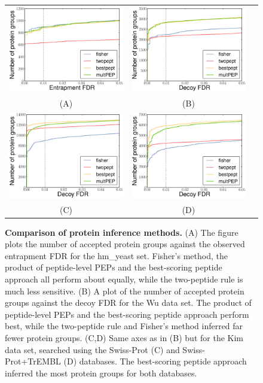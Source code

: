 \documentclass{article}
\begin{document}
\begin{figure}
\centering
\begin{tabular}{ccc}
\includegraphics[width=0.45\linewidth]
{./img/unique-pept-performance} &
\includegraphics[width=0.45\linewidth]
{./img/wu-ipi-performance}\\
(A) & (B)\\
\includegraphics[width=0.45\linewidth]
{./img/kim-swissprot-performance} &
\includegraphics[width=0.45\linewidth]
{./img/kim-uniprot-performance}\\
(C) & (D)
\end{tabular}
  \caption{{\bf Comparison of protein inference methods.} (A) The
figure plots the number of accepted protein groups against the
observed entrapment FDR for the hm\_yeast set. Fisher's method, the
product of peptide-level PEPs and the best-scoring peptide approach
all perform about equally, while the two-peptide rule is much less
sensitive. (B) A plot of the number of accepted protein groups against
the decoy FDR for the Wu data set. The product of peptide-level PEPs
and the best-scoring peptide approach perform best, while the
two-peptide rule and Fisher's method inferred far fewer protein 
groups. (C,D) Same axes as in (B) but for the Kim data set, searched 
using the Swiss-Prot (C) and Swiss-Prot+TrEMBL (D) databases. The 
best-scoring peptide approach inferred the most protein groups for 
both databases.}
  \label{fig:power}
\end{figure}
\end{document}
